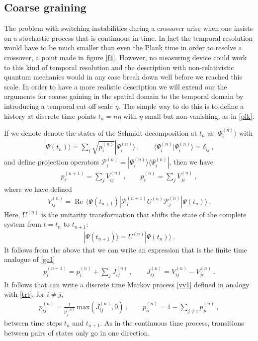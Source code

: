 \documentclass[12pt]{article}
\newcommand{\RE}{\operatorname{Re}}
\def\bra#1{\langle #1|}
\def\ket#1{| #1\rangle}
\def\PP{\mathscr{P}}
\newcommand{\EQ}[1]{\begin{equation}\begin{split} #1
\end{split}\end{equation}}
\begin{document}
\subsection{Coarse graining}\label{s4.3}

The problem with switching instabilities during a crossover arise when one insists on a stochastic process that is continuous in time. In fact the temporal resolution would have to be much smaller than even the Plank time in order to resolve a crossover, a point made in figure \ref{f4}. However, no measuring device could work to this kind of temporal resolution 
and the description with non-relativistic quantum mechanics would in any case break down well before we reached this scale. In order to have a more realistic description we will 
extend our the arguments for coarse gaining in the spatial domain to the temporal domain by introducing a temporal cut off scale $\eta$. The simple way to do this is to define a history at discrete time points $t_n=n\eta$ with $\eta$ small but non-vanishing, as in \eqref{plk}.

If we denote denote the states of the Schmidt decomposition at $t_n$ 
as $\ket{\Psi_i^{(n)}}$ with
\EQ{
\ket{\Psi(t_n)}=\sum_i\sqrt{p_i^{(n)}}\ket{\Psi_i^{(n)}}\ ,\qquad
\langle\Psi_i^{(n)}\ket{\Psi_i^{(n)}}=\delta_{ij}\ ,
}
and define projection operators $\PP_i^{(n)}=\ket{\Psi^{(n)}_i}\bra{\Psi^{(n)}_i}$,
then we have
\EQ{
p_i^{(n+1)}=\sum_jV^{(n)}_{ij}\ ,\qquad p_i^{(n)}=\sum_jV^{(n)}_{ji}\ ,
}
where we have defined
\EQ{
V^{(n)}_{ij}=\RE\,\bra{\Psi(t_{n+1})}\PP^{(n+1)}_iU^{(n)}\PP_j^{(n)}\ket{\Psi(t_n)}\ .
}
Here, $U^{(n)}$ is the unitarity transformation that shifts the state of the complete  system from $t=t_n$ to $t_{n+1}$:
\EQ{
\ket{\Psi(t_{n+1})}=U^{(n)}\ket{\Psi(t_n)}\ .
}
It follows from the above that we can write an expression that is the finite time analogue of \eqref{ge1}
\EQ{
p_i^{(n+1)}=p_i^{(n)}+\sum_jJ_{ij}^{(n)}\ ,\qquad J^{(n)}_{ij}=V^{(n)}_{ij}-V^{(n)}_{ji}\ .
}
It follows that can write a discrete time Markov process \eqref{vv1} defined in analogy with \eqref{trt}, for $i\neq j$, 
\EQ{
p_{ij}^{(n)}=\frac1{p_j^{(n)}}\,\text{max}\left(J_{ij}^{(n)},0\right)\ ,\qquad
p^{(n)}_{ii}=1-\sum_{j\neq i}p_{ji}^{(n)}\ ,
\label{trt2}
}
between time steps $t_n$ and $t_{n+1}$. As in the continuous time process, transitions between pairs of states only go in one direction.
\end{document}
